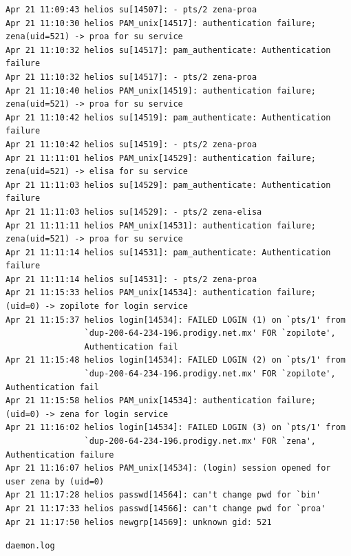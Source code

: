 \begin{lstlisting}[style=terminal]
Apr 21 11:09:43 helios su[14507]: - pts/2 zena-proa
Apr 21 11:10:30 helios PAM_unix[14517]: authentication failure; zena(uid=521) -> proa for su service
Apr 21 11:10:32 helios su[14517]: pam_authenticate: Authentication failure
Apr 21 11:10:32 helios su[14517]: - pts/2 zena-proa
Apr 21 11:10:40 helios PAM_unix[14519]: authentication failure; zena(uid=521) -> proa for su service
Apr 21 11:10:42 helios su[14519]: pam_authenticate: Authentication failure
Apr 21 11:10:42 helios su[14519]: - pts/2 zena-proa
Apr 21 11:11:01 helios PAM_unix[14529]: authentication failure; zena(uid=521) -> elisa for su service
Apr 21 11:11:03 helios su[14529]: pam_authenticate: Authentication failure
Apr 21 11:11:03 helios su[14529]: - pts/2 zena-elisa
Apr 21 11:11:11 helios PAM_unix[14531]: authentication failure; zena(uid=521) -> proa for su service
Apr 21 11:11:14 helios su[14531]: pam_authenticate: Authentication failure
Apr 21 11:11:14 helios su[14531]: - pts/2 zena-proa
Apr 21 11:15:33 helios PAM_unix[14534]: authentication failure; (uid=0) -> zopilote for login service
Apr 21 11:15:37 helios login[14534]: FAILED LOGIN (1) on `pts/1' from 
                `dup-200-64-234-196.prodigy.net.mx' FOR `zopilote', 
                Authentication fail
Apr 21 11:15:48 helios login[14534]: FAILED LOGIN (2) on `pts/1' from 
                `dup-200-64-234-196.prodigy.net.mx' FOR `zopilote', Authentication fail
Apr 21 11:15:58 helios PAM_unix[14534]: authentication failure; (uid=0) -> zena for login service
Apr 21 11:16:02 helios login[14534]: FAILED LOGIN (3) on `pts/1' from 
                `dup-200-64-234-196.prodigy.net.mx' FOR `zena', Authentication failure
Apr 21 11:16:07 helios PAM_unix[14534]: (login) session opened for user zena by (uid=0)
Apr 21 11:17:28 helios passwd[14564]: can't change pwd for `bin'
Apr 21 11:17:33 helios passwd[14566]: can't change pwd for `proa'
Apr 21 11:17:50 helios newgrp[14569]: unknown gid: 521
\end{lstlisting}

\vspace{1em}

\texttt{daemon.log}


\vspace{1em}

